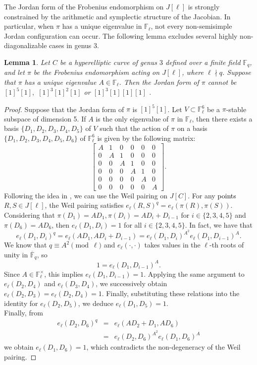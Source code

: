 \documentclass[11pt,a4paper]{article}
\theoremstyle{plain}
\newtheorem{lemma}[theorem]{Lemma}
\theoremstyle{definition}
\theoremstyle{remark}
\newcommand{\verde}[1]{\textcolor{black}{#1}}
\begin{document}
The Jordan form of the Frobenius endomorphism on $J[\ell]$ is strongly constrained by the arithmetic and symplectic structure of the Jacobian. In particular, when $\pi$ has a unique eigenvalue in $\mathbb{F}_\ell$, not every non-semisimple Jordan configuration can occur. The following lemma excludes several highly non-diagonalizable cases in genus $3$.

\begin{lemma}
Let $C$ be a hyperelliptic curve of genus $3$ defined over a finite field $\mathbb{F}_q$, and let $\pi$ be the Frobenius endomorphism acting on $J[\ell]$, where $\ell \nmid q$. Suppose that $\pi$ has a unique eigenvalue $A\in \mathbb{F}_\ell$.
Then the Jordan
form of $\pi$ cannot be  $[1]^5[1],$   $[1]^3[1]^2[1]$  or  $[1]^3[1][1][1]$ .
\end{lemma}
\begin{proof}
Suppose that the Jordan form of $\pi$ is  $[1]^5[1]$. Let $V\subset\mathbb{F}_{\ell}^6$ be a
$\pi$-stable subspace of dimension 5. If $A$ is the only eigenvalue of $\pi$ in $\mathbb{F}_\ell$, then there exists a basis  $\{D_1,D_2,D_3,D_4,D_5\}$ of $V$ such that the action of $\pi$ on a basis $\{D_1,D_2,D_3,D_4,D_5,D_6\}$ of $\mathbb{F}_{\ell}^6$ is given by the following matrix:
$$ \begin{bmatrix}
A & 1 & 0 & 0 & 0 & 0 \\
0 & A & 1 & 0 & 0 & 0 \\
0 & 0 & A & 1 & 0 & 0 \\
0 & 0 & 0 & A & 1 & 0 \\
0 & 0 & 0 & 0 & A & 0\\
0 & 0 & 0 & 0 & 0 & A
\end{bmatrix}.$$ 
Following the idea in \cite{GS05}, we can use the Weil pairing on $J[C]$. For any \verde{points} $R,S\in J[\ell]$, the Weil pairing satisfies $e_{\ell}(R,S)^q=e_{\ell}(\pi(R),\pi(S))$. Considering that  $\pi(D_1) = A D_1, \pi(D_i) = A D_i + D_{i-1}$ for $i \in \{2, 3, 4, 5\}$ and $\pi(D_6) = A D_6$, then $e_{\ell}(D_1,D_i)=1$ for all $i \in \{2,3,4,5\}$. 
In fact, we have that
\[
e_\ell(D_1,D_i)^q
= e_\ell(AD_1,AD_i+D_{i-1})
= e_\ell(D_1,D_i)^{A^2} e_\ell(D_1,D_{i-1})^A.
\]
We know that $q \equiv A^2 \pmod{\ell}$ and $e_{\ell}(\cdot,\cdot)$ takes values in the $\ell$-th roots of unity in $\overline{\mathbb{F}}_{q}$, so $$1 = e_{\ell}(D_1, D_{i-1})^A.$$ Since $A\in \mathbb{F}_{\ell}^{\times}$, this implies $e_\ell(D_1,D_{i-1})=1.$ Applying the same argument to $e_{\ell}(D_2,D_4)$ and $e_{\ell}(D_3,D_4)$, we successively obtain $e_\ell(D_2,D_3)=e_\ell(D_2,D_4)=1.$ Finally, substituting these relations into the identity for $e_{\ell}(D_2,D_5)$, we deduce $e_\ell(D_1,D_5)=1.$\\
Finally, from
\begin{eqnarray*}
    e_{\ell}(D_2,D_6)^q&=&e_{\ell}(AD_2+D_1,AD_6)\\
    &=&e_{\ell}(D_2,D_6)^{A^2}e_{\ell}(D_1,D_6)^{A}
\end{eqnarray*}
we obtain $e_\ell(D_1,D_6)=1$,
which contradicts the non-degeneracy of the Weil pairing.


\end{proof}
\end{document}
